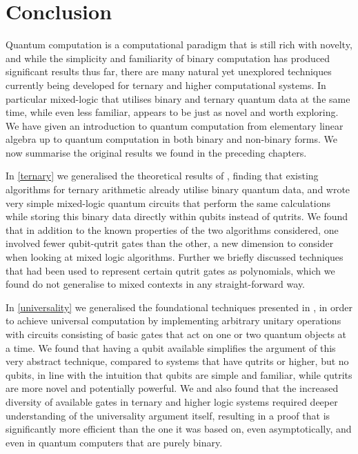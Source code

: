 \chapter{Conclusion}\label{conclusion}
Quantum computation is a computational paradigm that is still rich with novelty, and while the simplicity and familiarity of binary computation has produced significant results thus far, there are many natural yet unexplored techniques currently being developed for ternary and higher computational systems. In particular mixed-logic that utilises binary and ternary quantum data at the same time, while even less familiar, appears to be just as novel and worth exploring. We have given an introduction to quantum computation from elementary linear algebra up to quantum computation in both binary and non-binary forms. We now summarise the original results we found in the preceding chapters.

In \autoref{ternary} we generalised the theoretical results of \cite{arithmetics}, finding that existing algorithms for ternary arithmetic already utilise binary quantum data, and wrote very simple mixed-logic quantum circuits that perform the same calculations while storing this binary data directly within qubits instead of qutrits. We found that in addition to the known properties of the two algorithms considered, one involved fewer qubit-qutrit gates than the other, a new dimension to consider when looking at mixed logic algorithms. Further we briefly discussed techniques that had been used to represent certain qutrit gates as polynomials, which we found do not generalise to mixed contexts in any straight-forward way.

In \autoref{universality} we generalised the foundational techniques presented in \cite{cnot-decomposition, textbook}, in order to achieve universal computation by implementing arbitrary unitary operations with circuits consisting of basic gates that act on one or two quantum objects at a time. We found that having a qubit available simplifies the argument of this very abstract technique, compared to systems that have qutrits or higher, but no qubits, in line with the intuition that qubits are simple and familiar, while qutrits are more novel and potentially powerful. We and also found that the increased diversity of available gates in ternary and higher logic systems required deeper understanding of the universality argument itself, resulting in a proof that is significantly more efficient than the one it was based on, even asymptotically, and even in quantum computers that are purely binary.

